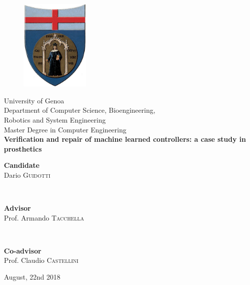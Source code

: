 \begin{titlepage}
%
\begin{center}
\begin{figure}[htbp]
\centering
\includegraphics[width=0.3\textwidth]{Images/unige2.jpg}
\end{figure}
%
{\LARGE University of Genoa\\}
%
%
{\Large {Department of Computer Science, Bioengineering,\\ Robotics and System Engineering}\\}
%
\vspace{0.7cm}
%
{\LARGE {Master Degree in Computer Engineering}\\}
%
\vspace{0.8cm}
%
%
%
{\Huge \textbf{Verification and repair of machine learned controllers: a case study in prosthetics}\\}
%
%
\vspace{1.0cm}
%
\end{center}
%
\begin{minipage}{\textwidth}
\begin{flushright}
{\Large{ \bfseries Candidate}\\[0.1cm]
Dario \textsc{Guidotti}}
\end{flushright}
\end{minipage}
\\[1cm]
%
\begin{minipage}{0.5\textwidth}
\begin{flushleft}
{\Large
{\bfseries Advisor}\\[0.1cm]
Prof. Armando \textsc{Tacchella}}
\end{flushleft}
\end{minipage}
\\[0.4cm]
\begin{minipage}{0.5\textwidth}
\begin{flushleft}
{\Large
{\bfseries Co-advisor}\\[0.1cm]
Prof. Claudio \textsc{Castellini}}
\end{flushleft}
\end{minipage}
%
\vfill
\begin{center}
{\Large August, 22nd 2018}
\end{center}
\end{titlepage}
